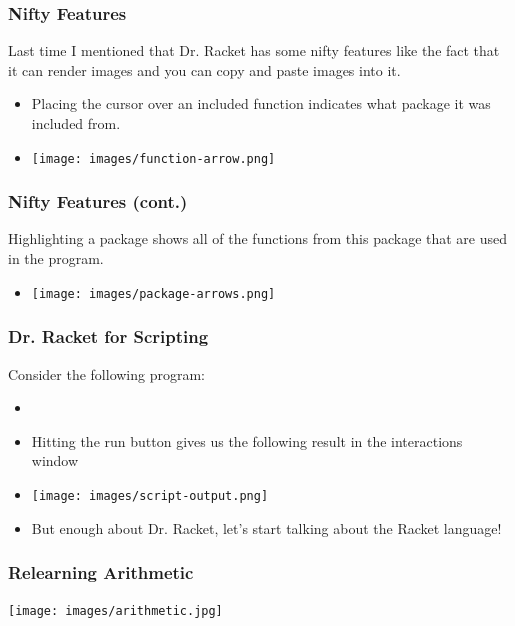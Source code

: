 \documentclass{beamer}
\begin{document}
\begin{frame}
  \frametitle{Nifty Features}
  Last time I mentioned that Dr. Racket has some nifty features like the fact that it can render images and you can copy and paste images
  into it.
  \begin{itemize}
  \item<2-> Placing the cursor over an included function indicates what package it was included from.
  \item<3-> \texttt{[image: images/function-arrow.png]}
  \end{itemize}
\end{frame}

\begin{frame}
  \frametitle{Nifty Features (cont.)}
  Highlighting a package shows all of the functions from this package that are used in the program.
  \begin{itemize}
  \item<2-> \texttt{[image: images/package-arrows.png]}    
  \end{itemize}
\end{frame}


\begin{frame}
  \frametitle{Dr. Racket for Scripting}
  Consider the following program:
  \begin{itemize}
  \item<1->  \script
  \item<2-> Hitting the run button gives us the following result in the interactions window
  \item<3-> \texttt{[image: images/script-output.png]}
  \item<4-> But enough about Dr. Racket, let's start talking about the Racket language!
  \end{itemize}
\end{frame}

\begin{frame}
  \frametitle{Relearning Arithmetic}
  \begin{center}
    \texttt{[image: images/arithmetic.jpg]}
  \end{center}
\end{frame}
\end{document}
